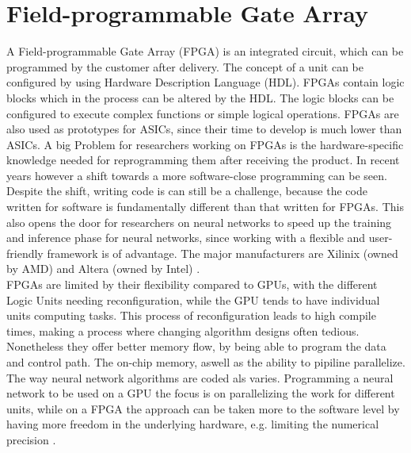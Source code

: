 \documentclass[conference]{IEEEtran}
\begin{document}
\section{Field-programmable Gate Array}
A Field-programmable Gate Array (FPGA) is an integrated circuit, which can be programmed by the customer after delivery. The concept of a unit can be configured by using Hardware Description Language (HDL). FPGAs contain logic blocks which in the process can be altered by the HDL. The logic blocks can be configured to execute complex functions or simple logical operations. FPGAs are also used as prototypes for ASICs, since their time to develop is much lower than ASICs. A big Problem for researchers working on FPGAs is the hardware-specific knowledge needed for reprogramming them after receiving the product. In recent years however a shift towards a more software-close programming can be seen. Despite the shift, writing code is can still be a challenge, because the code written for software is fundamentally different than that written for FPGAs. This also opens the door for researchers on neural networks to speed up the training and inference phase for neural networks, since working with a flexible and user-friendly framework is of advantage. The major manufacturers are Xilinix (owned by AMD) and Altera (owned by Intel) \cite{majorfpga}.
\\
FPGAs are limited by their flexibility compared to GPUs, with the different Logic Units needing reconfiguration, while the GPU tends to have individual units computing tasks. This process of reconfiguration leads to high compile times, making a process where changing algorithm designs often tedious. Nonetheless they offer better memory flow, by being able to program the data and control path. The on-chip memory, aswell as the ability to pipiline parallelize. The way neural network algorithms are coded als varies. Programming a neural network to be used on a GPU the focus is on parallelizing the work for different units, while on a FPGA the approach can be taken more to the software level by having more freedom in the underlying hardware, e.g. limiting the numerical precision \cite{gupta2015deep}.
\\
\end{document}
